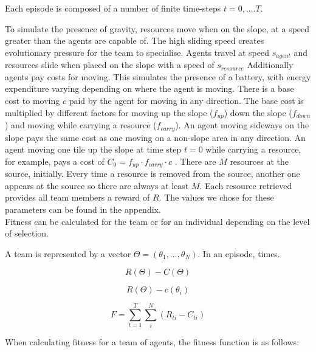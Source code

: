 \documentclass[12pt]{article}  %
\begin{document}
Each episode is composed of a number of finite time-steps $t=0, .... T$. 




To simulate the presence of gravity, resources move when on the slope, at a speed greater than the agents are capable of.
The high sliding speed creates evolutionary pressure for the team to specialise.
Agents travel at speed $s_{agent}$ and resources slide when placed on the slope with a speed of $s_{resource}$ 
Additionally agents pay costs for moving.
This simulates the presence of a battery, with energy expenditure varying depending on where the agent is moving.
There is a base cost to moving $c$ paid by the agent for moving in any direction.
The base cost is multiplied by different factors for moving up the slope ($f_{up}$) down the slope ($f_{down}$) and moving while carrying a resource ($f_{carry}$). 
An agent moving sideways on the slope pays the same cost as one moving on a non-slope area in any direction.
An agent moving one tile up the slope at time step $t=0$ while carrying a resource, for example, pays a cost of $C_{0} = f_{up} \cdot f_{carry} \cdot c$ .
There are $M$ resources at the source, initially.
Every time a resource is removed from the source, another one appears at the source so there are always at least $M$.
Each resource retrieved provides all team members a reward of $R$.
The values we chose for these parameters can be found in the appendix.\\

Fitness can be calculated for the team or for an individual depending on the level of selection.

A team is represented by a vector $\Theta = (\theta_1, \dots, \theta_N)$. In an episode, times.

$$R(\Theta) - C(\Theta)$$

$$R(\Theta) - c(\theta_i)$$




\begin{equation}
  F = \sum_{t=1}^{T} \sum_{i}^{N} (R_{ti} - C_{ti})  
  \label{eq:fitness_team}
\end{equation}



When calculating fitness for a team of agents, the fitness function is as follows:\\ 
\end{document}
